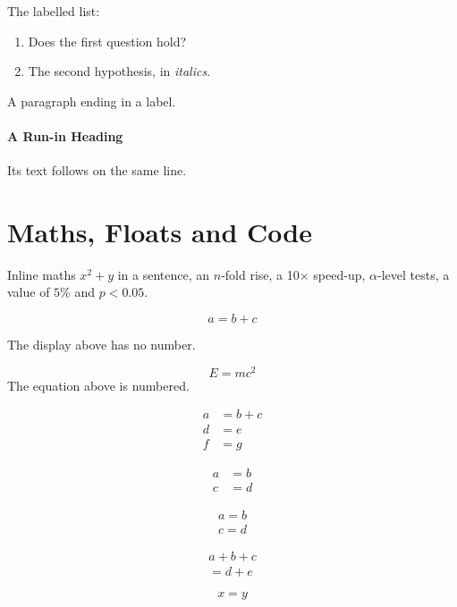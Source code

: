 The labelled list:

\begin{enumerate}
  \item[\textbf{RQ1}] \hypertarget{rq1}{}Does the first question hold?
  \item[\textbf{H2a}] \hypertarget{hyp2a}{}The second hypothesis, in \emph{italics}.
\end{enumerate}

\label{sec:text:anchor}
A paragraph ending in a label.

\paragraph{A Run-in Heading} Its text follows on the same line.

\section{Maths, Floats and Code}
\label{sec:floats}

Inline maths $x^2 + y$ in a sentence, an $n$-fold rise, a 10$\times$ speed-up, $\alpha$-level tests, a value of $5$\% and $p<0.05$.

\[
a = b + c
\]

The display above has no number.

\begin{equation}
E = m c^2
  \label{eq:demo}
\end{equation}
The equation above is numbered.

\begin{align}
  a &= b + c \\
  d &= e \nonumber \\
  f &= g \tag{T}
\end{align}

\begin{align*}
  a &= b \\
  c &= d
\end{align*}

\begin{gather}
  a = b \\
  c = d
\end{gather}

\begin{multline}
  a + b + c \\
  = d + e
\end{multline}

\begin{equation*}
  x = y
\end{equation*}

